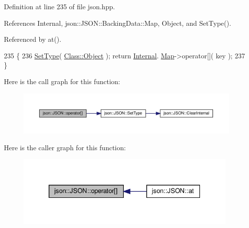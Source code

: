 Definition at line 235 of file json.\+hpp.



References Internal, json\+::\+J\+S\+O\+N\+::\+Backing\+Data\+::\+Map, Object, and Set\+Type().



Referenced by at().


\begin{DoxyCode}
235                                               \{
236             \mbox{\hyperlink{classjson_1_1_j_s_o_n_a668500208950e48394fc8bfe7c320205}{SetType}}( \mbox{\hyperlink{classjson_1_1_j_s_o_n_a762f55df6d407c1af61607ed516ffe07a497031794414a552435f90151ac3b54b}{Class::Object}} ); \textcolor{keywordflow}{return} \mbox{\hyperlink{classjson_1_1_j_s_o_n_a1e2a064794c3d55c8bb8887fc5734947}{Internal}}.
      \mbox{\hyperlink{unionjson_1_1_j_s_o_n_1_1_backing_data_ab2e19b00745b37d2add157ff3a35c431}{Map}}->operator[]( key );
237         \}
\end{DoxyCode}
Here is the call graph for this function\+:
\nopagebreak
\begin{figure}[H]
\begin{center}
\leavevmode
\includegraphics[width=350pt]{classjson_1_1_j_s_o_n_a29c695c67a5b34a3b59af0da3c25d6b1_cgraph}
\end{center}
\end{figure}
Here is the caller graph for this function\+:
\nopagebreak
\begin{figure}[H]
\begin{center}
\leavevmode
\includegraphics[width=313pt]{classjson_1_1_j_s_o_n_a29c695c67a5b34a3b59af0da3c25d6b1_icgraph}
\end{center}
\end{figure}
\mbox{\label{classjson_1_1_j_s_o_n_ad590ba3c1aa11aad67e03138ffdc1488}} 
